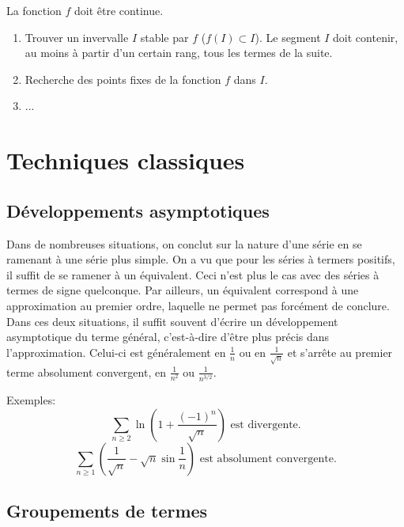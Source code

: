La fonction $f$ doit être continue. 
\begin{enumerate}
    \item Trouver un invervalle $I$ stable par $f$ ($f(I) \subset I$). Le segment $I$ doit contenir, au moins à partir d'un certain rang, tous les termes de la suite.
    \item Recherche des points fixes de la fonction $f$ dans $I$.
    \item ...
\end{enumerate}

\section{Techniques classiques}
\subsection{Développements asymptotiques}

Dans de nombreuses situations, on conclut sur la nature d'une série en se ramenant à une série plus simple. On a vu que pour les séries à termers positifs, il suffit de se ramener à un équivalent. Ceci n'est plus le cas avec des séries à termes de signe quelconque. Par ailleurs, un équivalent correspond à une approximation au premier ordre, laquelle ne permet pas forcément de conclure. \\
Dans ces deux situations, il suffit souvent d'écrire un développement asymptotique du terme général, c'est-à-dire d'être plus précis dans l'approximation. Celui-ci est généralement en $\frac{1}{n}$ ou en $\frac{1}{\sqrt{n}}$ et s'arrête au premier terme absolument convergent, en $\frac{1}{n^2}$ ou $\frac{1}{n^{3/2}}$.

Exemples: \\
$$\sum_{n \geqslant 2} \ln \left(1 + \frac{(-1)^n}{\sqrt{n}}\right) \text{ est divergente}.$$
$$\sum_{n \geqslant 1} \left(\frac{1}{\sqrt{n}} - \sqrt{n} \sin \frac{1}{n} \right) \text{ est absolument convergente}.$$

\subsection{Groupements de termes}

